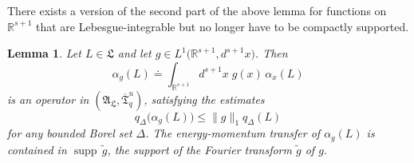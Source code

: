 \documentclass[11pt,twoside,openright]{report}
\theoremstyle{definition}
\theoremstyle{plain}
\newtheorem{Lem}[Def]{Lemma}
\theoremstyle{remark}
\theoremstyle{assumption}
\DeclareMathOperator{\supp}{supp}
\newcommand{\norm}[1]{\lVert #1 \rVert}
\newcommand{\qDx}[1]{q_\Delta ( #1 )}
\newcommand{\bqDx}[1]{q_\Delta \bigl( #1 \bigr)}
\newcommand{\Lfrak}{\mathfrak{L}}
\newcommand{\Rsone}{\mathbb{R}^{s + 1}}
\newcommand{\Tfrakbar}{\overline{\mathfrak{T}}}
\newcommand{\AL}{\mathfrak{A}_\mathfrak{L}}
\newcommand{\ax}{\alpha_x}
\begin{document}
There exists a version of the second part of the above lemma for
functions on $\Rsone$ that are Lebesgue-integrable but no longer have
to be compactly supported.
\begin{Lem}
  \label{Lem-Lebesgue-Bochner-integrals}
  Let $L \in \Lfrak$ and let $g \in L^1 \bigl( \Rsone , d^{s + 1} x
  \bigr)$. Then
  \begin{equation}
    \label{eq-alpha-g-def}
    \alpha_g ( L ) \doteq \int_{\Rsone} d^{s + 1} x \; g ( x ) \,
    \ax ( L )
  \end{equation}
  is an operator in $( \AL , \Tfrakbar^u_q )$, satisfying the
  estimates 
  \begin{equation}
    \label{eq-alpha-g-estimates}
    \bqDx{\alpha_g ( L )} \leqslant \norm{g}_1 \qDx{L}
  \end{equation}
  for any bounded Borel set $\Delta$. The energy-momentum transfer of
  $\alpha_g (L)$ is contained in $\supp \, \tilde{g}$, the support of
  the Fourier transform $\tilde{g}$ of $g$.
\end{Lem}
\end{document}
